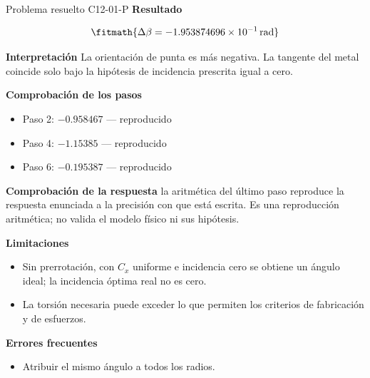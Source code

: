 \documentclass[10pt,openany]{book}
\begin{document}
\begin{studiumworked}{Problema resuelto C12-01-P}
\noindent\textbf{Resultado}

\[
\fitmath{\Delta\beta=-1.953874696\times10^{-1}\,\mathrm{rad}}
\]

\noindent\textbf{Interpretación}
La orientación de punta es más negativa. La tangente del metal coincide solo bajo la hipótesis de incidencia prescrita igual a cero.

\noindent\textbf{Comprobación de los pasos}
\begin{itemize}
\item Paso 2: $-0.958467$ — reproducido
\item Paso 4: $-1.15385$ — reproducido
\item Paso 6: $-0.195387$ — reproducido
\end{itemize}

\noindent\textbf{Comprobación de la respuesta} la aritmética del último paso reproduce la respuesta enunciada a la precisión con que está escrita. Es una reproducción aritmética; no valida el modelo físico ni sus hipótesis.

\noindent\textbf{Limitaciones}
\begin{itemize}
\item Sin prerrotación, con $C_x$ uniforme e incidencia cero se obtiene un ángulo ideal; la incidencia óptima real no es cero.
\item La torsión necesaria puede exceder lo que permiten los criterios de fabricación y de esfuerzos.
\end{itemize}

\noindent\textbf{Errores frecuentes}
\begin{itemize}
\item Atribuir el mismo ángulo a todos los radios.
\end{itemize}
\end{studiumworked}
\end{document}

